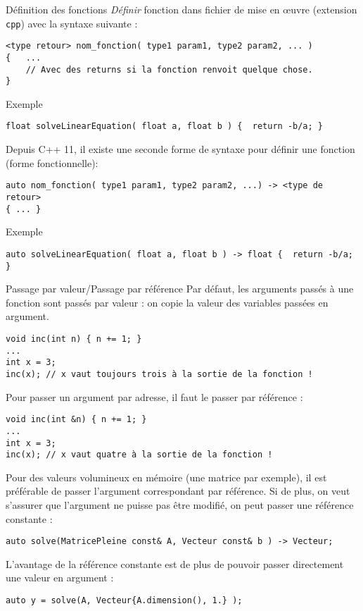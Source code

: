 \documentclass[compress,10pt,aspectratio=169]{beamer}
\begin{document}
\begin{frame}[fragile]{Définition des fonctions}
\scriptsize
\textsl{Définir} fonction dans fichier de mise en {\oe}uvre (extension \texttt{cpp}) avec la syntaxe suivante :
\begin{verbatim}
<type retour> nom_fonction( type1 param1, type2 param2, ... )
{   ...
    // Avec des returns si la fonction renvoit quelque chose.
}
\end{verbatim}

\begin{exampleblock}{\small Exemple}
\begin{verbatim}
float solveLinearEquation( float a, float b ) {  return -b/a; }
\end{verbatim}
\end{exampleblock}

Depuis C++ 11, il existe une seconde forme de syntaxe pour définir une fonction (forme fonctionnelle):
\begin{verbatim}
auto nom_fonction( type1 param1, type2 param2, ...) -> <type de retour>
{ ... }
\end{verbatim}

\vspace*{-4mm}
\begin{exampleblock}{\small Exemple}
\begin{verbatim}
auto solveLinearEquation( float a, float b ) -> float {  return -b/a; }
\end{verbatim}
\end{exampleblock}    
\end{frame}

\begin{frame}[fragile]{Passage par valeur/Passage par référence}
    \scriptsize
    Par défaut, les arguments passés à une fonction sont passés par valeur : on copie la valeur des variables passées en argument.

    \begin{verbatim}
void inc(int n) { n += 1; }
...
int x = 3;
inc(x); // x vaut toujours trois à la sortie de la fonction !
\end{verbatim}

Pour passer un argument par adresse, il faut le passer par référence :
\begin{verbatim}
void inc(int &n) { n += 1; }
...
int x = 3;
inc(x); // x vaut quatre à la sortie de la fonction !
\end{verbatim}

Pour des valeurs volumineux en mémoire (une matrice par exemple), il est préférable de passer l'argument correspondant par référence.
Si de plus, on veut s'assurer que l'argument ne puisse pas être modifié, on peut passer une référence constante :
\begin{verbatim}
auto solve(MatricePleine const& A, Vecteur const& b ) -> Vecteur;
\end{verbatim}

L'avantage de la référence constante est de plus de pouvoir passer directement une valeur en argument :
\begin{verbatim}
auto y = solve(A, Vecteur{A.dimension(), 1.} );
\end{verbatim}
\end{frame}
\end{document}
